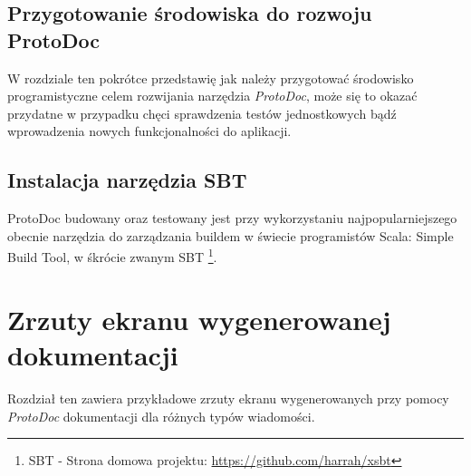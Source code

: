 \documentclass[pdflatex,11pt]{aghdpl}
\begin{document}
\section{Przygotowanie środowiska do rozwoju ProtoDoc}
\label{sec:prepare_env}
W rozdziale ten pokrótce przedstawię jak należy przygotować środowisko programistyczne celem rozwijania narzędzia \textit{ProtoDoc},
może się to okazać przydatne w przypadku chęci sprawdzenia testów jednostkowych bądź wprowadzenia nowych funkcjonalności do aplikacji.

\subsection{}

\section{Instalacja narzędzia SBT}
ProtoDoc budowany oraz testowany jest przy wykorzystaniu najpopularniejszego obecnie narzędzia do zarządzania buildem w świecie programistów Scala:
Simple Build Tool, w śkrócie zwanym SBT \footnote{SBT - Strona domowa projektu: \href{https://github.com/harrah/xsbt}{https://github.com/harrah/xsbt}}.




\newpage
\chapter{Zrzuty ekranu wygenerowanej dokumentacji}
\label{sec:screenshots}
Rozdział ten zawiera przykładowe zrzuty ekranu wygenerowanych przy pomocy \textit{ProtoDoc} dokumentacji dla różnych typów wiadomości.
\end{document}
